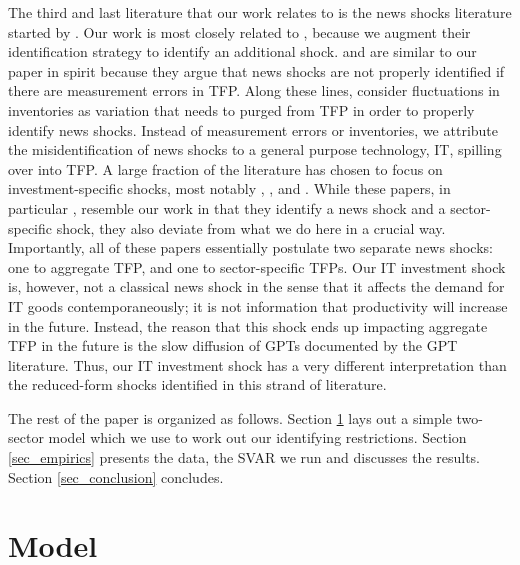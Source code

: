 \documentclass[11pt]{article}
\renewcommand{\[}{\begin{equation}}
\renewcommand{\]}{\end{equation}}
\begin{document}
The third and last literature that our work relates to is the news shocks literature started by  \cite{beaudry_portier2006}. Our work is most closely related to \cite{barsky_sims2011}, because we augment their identification strategy to identify an additional shock. \cite{bouakez_kemoe2017} and \cite{kurmann_sims2017} are similar to our paper in spirit because they argue that news shocks are not properly identified if there are measurement errors in TFP. Along these lines, \cite{crouzet_oh2014} consider fluctuations in inventories as variation that needs to purged from TFP in order to properly identify news shocks. Instead of measurement errors or inventories, we attribute the misidentification of news shocks to a general purpose technology, IT, spilling over into TFP.  A large fraction of the literature has chosen to focus on investment-specific shocks, most notably \cite{greenwood_etal1997}, \cite{fisher2006}, \cite{chen_wemy2015} and \cite{cummins_violante2002}. While these papers, in particular \cite{fisher2006}, resemble our work in that they identify a news shock and a sector-specific shock, they also deviate from what we do here in a crucial way. Importantly, all of these papers essentially postulate two separate news shocks: one to aggregate TFP, and one to sector-specific TFPs. Our IT investment shock is, however, not a classical news shock in the sense that it affects the demand for IT goods contemporaneously; it is not information that productivity will increase in the future. Instead, the reason that this shock ends up impacting aggregate TFP in the future is the slow diffusion of GPTs documented by the GPT literature. Thus, our IT investment shock has a very different interpretation than the reduced-form shocks identified in this strand of literature. 

The rest of the paper is organized as follows. Section \ref{sec_model} lays out a simple two-sector model which we use to work out our identifying restrictions. Section \ref{sec_empirics} presents the data, the SVAR we run and discusses the results. Section \ref{sec_conclusion} concludes. 



\section{Model}
\label{sec_model}

\end{document}
